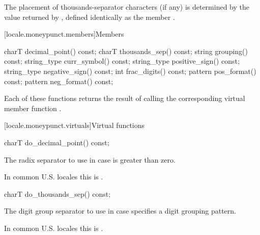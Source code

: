 \pnum
The placement of thousands-separator characters (if any)
is determined by the value returned by ,
defined identically as the member .

[locale.moneypunct.members]{Members}

%
%
%
%
%
%
%
%
%
\begin{codeblock}
charT       decimal_point() const;
charT       thousands_sep() const;
string      grouping()      const;
string_type curr_symbol()   const;
string_type positive_sign() const;
string_type negative_sign() const;
int         frac_digits()   const;
pattern     pos_format()    const;
pattern     neg_format()    const;
\end{codeblock}

\pnum
Each of these functions 
returns the result of calling the corresponding
virtual member function
.

[locale.moneypunct.virtuals]{Virtual functions}

%
\begin{itemdecl}
charT do_decimal_point() const;
\end{itemdecl}

\begin{itemdescr}
\pnum
\returns
The radix separator to use
in case  is greater than zero.
\begin{footnote}
In common U.S. locales this is .
\end{footnote}
\end{itemdescr}

%
\begin{itemdecl}
charT do_thousands_sep() const;
\end{itemdecl}

\begin{itemdescr}
\pnum
\returns
The digit group separator to use
in case  specifies a digit grouping pattern.
\begin{footnote}
In common U.S. locales this is .
\end{footnote}
\end{itemdescr}

